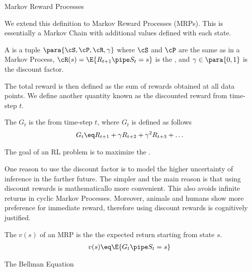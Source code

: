 \documentclass{article}
\begin{document}
\begin{ssection}{Markov Reward Processes}

	We extend this definition to Markov Reward Processes (MRPs). This is essentially a
	Markov Chain with additional values defined with each state.
	\begin{definition}
		\label{def:markov-reward-process}
		A  is a tuple $\para{\cS, \cP, \cR, \gamma}$
		where $\cS$ and $\cP$ are the same as in a Markov Process, $\cR(s) =
		\E{R_{t + 1} \pipe S_t = s}$ is the , and $\gamma
		\in \para{0, 1}$ is the discount factor.
	\end{definition}

	The total reward is then defined as the sum of rewards obtained at all data
	points. We define another quantity known as the discounted reward from
	time-step $t$.
	\begin{definition}
		\label{def:return}
		The  $G_t$ is the  from time-step
		$t$, where $G_t$ is defined as follows
		\begin{align*}
			G_t \eq R_{t + 1} + \gamma R_{t + 2} + \gamma^2 R_{t + 3} + \dots
		\end{align*}
	\end{definition}
	The goal of an RL problem is to maximize the \et{return}.

	 One reason to use the discount factor is to model the
	higher uncertainty of inference in the farther future. The simpler and the
	main reason is that using discount rewards is mathematicallo more
	convenient. This also avoids infinite returns in cyclic Markov Processes.
	Moreover, animals and humans show more preference for immediate reward,
	therefore using discount rewards is cognitively justified.

	\begin{definition}
		\label{def:value-function}
		The  $v(s)$ of an MRP is the the expected
		return starting from state $s$.
		\begin{align*}
			v(s) \eq \E{G_t \pipe S_t = s}
		\end{align*}
	\end{definition}


	\begin{ssubsection}{The Bellman Equation}


\end{ssubsection}
\end{ssection}
\end{document}
